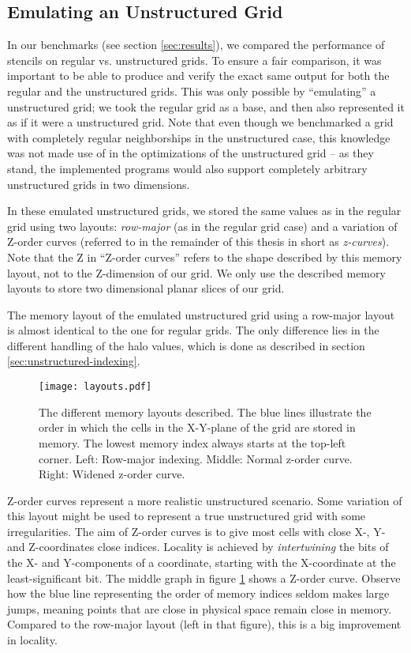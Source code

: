 \subsection{Emulating an Unstructured Grid} \label{sec:emulating}

In our benchmarks (see section \ref{sec:results}), we compared the performance of stencils on regular vs. unstructured grids. To ensure a fair comparison, it was important to be able to produce and verify the exact same output for both the regular and the unstructured grids. This was only possible by ``emulating'' a unstructured grid; we took the regular grid as a base, and then also represented it as if it were a unstructured grid. Note that even though we benchmarked a grid with completely regular neighborships in the unstructured case, this knowledge was not made use of in the optimizations of the unstructured grid -- as they stand, the implemented programs would also support completely arbitrary unstructured grids in two dimensions.

In these emulated unstructured grids, we stored the same values as in the regular grid using two layouts: \emph{row-major} (as in the regular grid case) and a variation of Z-order curves (referred to in the remainder of this thesis in short as \emph{z-curves}). Note that the Z in ``Z-order curves'' refers to the shape described by this memory layout, not to the Z-dimension of our grid. We only use the described memory layouts to store two dimensional planar slices of our grid.

The memory layout of the emulated unstructured grid using a row-major layout is almost identical to the one for regular grids. The only difference lies in the different handling of the halo values, which is done as described in section \ref{sec:unstructured-indexing}. 

\begin{figure}
	\texttt{[image: layouts.pdf]}
	\caption{\label{fig:layouts} The different memory layouts described. The blue lines illustrate the order in which the cells in the X-Y-plane of the grid are stored in memory. The lowest memory index always starts at the top-left corner. Left: Row-major indexing. Middle: Normal z-order curve. Right: Widened z-order curve.}
\end{figure}

Z-order curves\cite{wiki:z-curves} represent a more realistic unstructured scenario. Some variation of this layout might be used to represent a true unstructured grid with some irregularities. The aim of Z-order curves is to give most cells with close X-, Y- and Z-coordinates close indices. Locality is achieved by \emph{intertwining} the bits of the X- and Y-components of a coordinate, starting with the X-coordinate at the least-significant bit. The middle graph in figure \ref{fig:layouts} shows a Z-order curve. Observe how the blue line representing the order of memory indices seldom makes large jumps, meaning points that are close in physical space remain close in memory. Compared to the row-major layout (left in that figure), this is a big improvement in locality.

